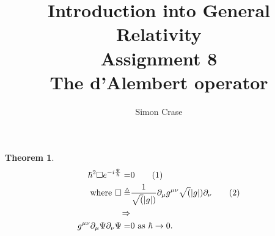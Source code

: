 \documentclass[]{article}
\title{Introduction into General Relativity\\Assignment 8\\The d'Alembert operator}
\author{Simon Crase}
\newtheorem{theorem}{Theorem}
\newcommand\numberthis{\addtocounter{equation}{1}\tag{\theequation}}
\begin{document}
\maketitle


\begin{theorem}
\begin{align*}
	\hbar^2 \Box e^{-i\frac{\Psi}{\hbar}}=&0 \numberthis \label{eq:hypothesis}\\ \text{ where } \Box \triangleq& \frac{1}{\sqrt(|g|)} \partial_{\mu} g^{\mu\nu}\sqrt(|g|)\partial_{\nu}\numberthis\label{eq:dlambert}\\ \Rightarrow&\\ g^{\mu\nu}\partial_{\mu}\Psi \partial_{\nu}\Psi=&0 \text{ as }\hbar \rightarrow 0.
\end{align*}
\end{theorem}
\end{document}
